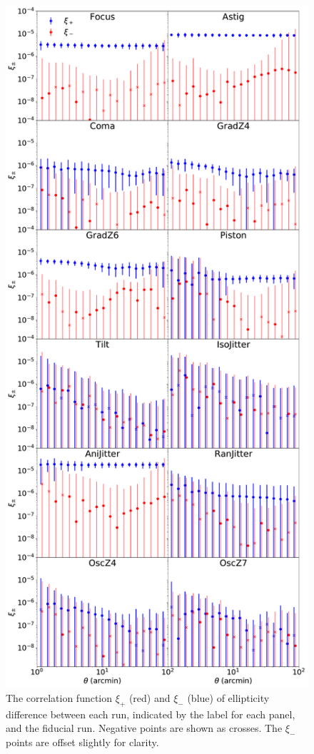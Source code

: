 \documentclass[aps,prd, amsmath,amssymb,superscriptaddress,showkeys,nofootinbib,reprint,preprintnumbers]{revtex4-1}
\begin{document}
\begin{figure}
\begin{center}
\includegraphics[width=\columnwidth]{figures/2pt_corrs.pdf}
\end{center}
\caption[]{ The correlation function $\xi_+$ (red) and $\xi_-$ (blue) of ellipticity difference between each run, indicated by the label for each panel, and the fiducial run. Negative points are shown as crosses. The $\xi_-$ points are offset slightly for clarity.
\label{fig:f2pt_corrs}}
\end{figure}
\end{document}
